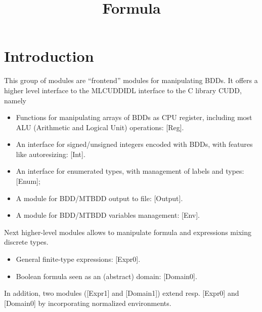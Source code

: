 \documentclass[twoside,10pt,a4paper]{report}
\title{Formula}
\begin{document}
\maketitle

\tableofcontents

\chapter{Introduction}

This group of modules are ``frontend'' modules for manipulating
BDDs. It offers a higher level interface to the
MLCUDDIDL interface to the C library CUDD, namely
\begin{itemize}
\item Functions for manipulating arrays of BDDs as CPU register, including
  most ALU (Arithmetic and Logical Unit) operations: [Reg].
\item An interface for signed/unsigned integers encoded with BDDs, with
  features like autoresizing: [Int].
\item An interface for enumerated types, with management of labels and types: [Enum];
\item A module for BDD/MTBDD output to file: [Output].
\item A module for BDD/MTBDD variables management: [Env].
\end{itemize}

Next higher-level modules allows to manipulate formula and
expressions mixing discrete types.
\begin{itemize}
\item General finite-type expressions: [Expr0].
\item Boolean formula seen as an (abstract) domain: [Domain0].
\end{itemize}
In addition, two modules ([Expr1] and [Domain1]) extend
resp. [Expr0] and [Domain0] by incorporating normalized
environments.


\end{document}
